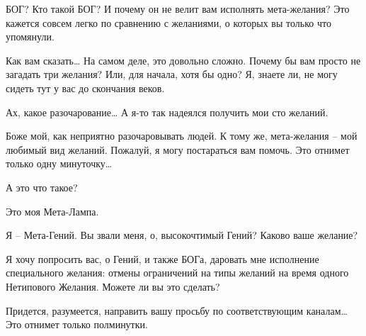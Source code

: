 \documentclass[../main.tex]{subfiles}
\begin{document}
\begin{Dialogue}
\begin{sublevel}
\begin{sublevel}
 БОГ? Кто такой БОГ? И почему он не велит вам исполнять мета-желания? Это кажется совсем легко по сравнению с желаниями, о которых вы только что упомянули.

 Как вам сказать\ldots{} На самом деле, это довольно сложно. Почему бы вам просто не загадать три желания? Или, для начала, хотя бы одно? Я, знаете ли, не могу сидеть тут у вас до скончания веков.

 Ах, какое разочарование\ldots{} А я-то так надеялся получить мои сто желаний.

 Боже мой, как неприятно разочаровывать людей. К тому же, мета-желания \--- мой любимый вид желаний. Пожалуй, я могу постараться вам помочь. Это отнимет только одну минуточку\ldots{}


 А это что такое?

 Это моя Мета-Лампа.


\begin{sublevel}
     Я \--- Мета-Гений. Вы звали меня, о, высокочтимый Гений? Каково ваше желание?
\end{sublevel}

 Я хочу попросить вас, о Гений, и также БОГа, даровать мне исполнение специального желания: отмены ограничений на типы желаний на время одного Нетипового Желания. Можете ли вы это сделать?

\begin{sublevel}

 Придется, разумеется, направить вашу просьбу по соответствующим каналам\ldots{} Это отнимет только полминутки.



\end{sublevel}
\end{sublevel}
\end{sublevel}
\end{Dialogue}
\end{document}
